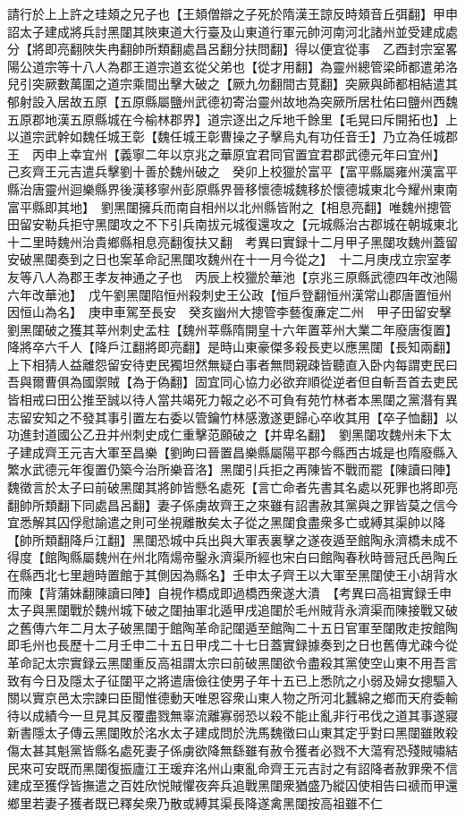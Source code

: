 請行於上上許之珪頍之兄子也【王頍僧辯之子死於隋漢王諒反時頍音丘弭翻】甲申詔太子建成將兵討黑闥其陜東道大行臺及山東道行軍元帥河南河北諸州並受建成處分【將即亮翻陜失冉翻帥所類翻處昌呂翻分扶問翻】得以便宜從事　乙酉封宗室畧陽公道宗等十八人為郡王道宗道玄從父弟也【從才用翻】為靈州總管梁師都遣弟洛兒引突厥數萬圍之道宗乘間出擊大破之【厥九勿翻間古莧翻】突厥與師都相結遣其郁射設入居故五原【五原縣屬鹽州武德初寄治靈州故地為突厥所居杜佑曰鹽州西魏五原郡地漢五原縣城在今榆林郡界】道宗逐出之斥地千餘里【毛晃曰斥開拓也】上以道宗武幹如魏任城王彰【魏任城王彰曹操之子擊烏丸有功任音壬】乃立為任城郡王　丙申上幸宜州【義寧二年以京兆之華原宜君同官置宜君郡武德元年曰宜州】　己亥齊王元吉遣兵擊劉十善於魏州破之　癸卯上校獵於富平【富平縣屬雍州漢富平縣治唐靈州迴樂縣界後漢移寧州彭原縣界晉移懷德城魏移於懷德城東北今耀州東南富平縣即其地】　劉黑闥擁兵而南自相州以北州縣皆附之【相息亮翻】唯魏州摠管田留安勒兵拒守黑闥攻之不下引兵南拔元城復還攻之【元城縣治古郡城在朝城東北十二里時魏州治貴鄉縣相息亮翻復扶又翻　考異曰實録十二月甲子黑闥攻魏州蓋留安破黑闥奏到之日也案革命記黑闥攻魏州在十一月今從之】　十二月庚戌立宗室孝友等八人為郡王孝友神通之子也　丙辰上校獵於華池【京兆三原縣武德四年改池陽六年改華池】　戊午劉黑闥陷恒州殺刺史王公政【恒戶登翻恒州漢常山郡唐置恒州因恒山為名】　庚申車駕至長安　癸亥幽州大摠管李藝復亷定二州　甲子田留安擊劉黑闥破之獲其莘州刺史孟柱【魏州莘縣隋開皇十六年置莘州大業二年廢唐復置】降將卒六千人【降戶江翻將即亮翻】是時山東豪傑多殺長吏以應黑闥【長知兩翻】上下相猜人益離怨留安待吏民獨坦然無疑白事者無問親疎皆聽直入卧内每謂吏民曰吾與爾曹俱為國禦賊【為于偽翻】固宜同心協力必欲弃順從逆者但自斬吾首去吏民皆相戒曰田公推至誠以待人當共竭死力報之必不可負有苑竹林者本黑闥之黨潛有異志留安知之不發其事引置左右委以管鑰竹林感激遂更歸心卒收其用【卒子恤翻】以功進封道國公乙丑并州刺史成仁重擊范願破之【并卑名翻】　劉黑闥攻魏州未下太子建成齊王元吉大軍至昌樂【劉昫曰晉置昌樂縣屬陽平郡今縣西古城是也隋廢縣入繁水武德元年復置仍築今治所樂音洛】黑闥引兵拒之再陳皆不戰而罷【陳讀曰陣】魏徵言於太子曰前破黑闥其將帥皆懸名處死【言亡命者先書其名處以死罪也將即亮翻帥所類翻下同處昌呂翻】妻子係虜故齊王之來雖有詔書赦其黨與之罪皆莫之信今宜悉解其囚俘慰諭遣之則可坐視離散矣太子從之黑闥食盡衆多亡或縛其渠帥以降【帥所類翻降戶江翻】黑闥恐城中兵出與大軍表裏擊之遂夜遁至館陶永濟橋未成不得度【館陶縣屬魏州在州北隋煬帝鑿永濟渠所經也宋白曰館陶春秋時晉冠氏邑陶丘在縣西北七里趙時置館于其側因為縣名】壬申太子齊王以大軍至黑闥使王小胡背水而陳【背蒲妹翻陳讀曰陣】自視作橋成即過橋西衆遂大潰　【考異曰高祖實録壬申太子與黑闥戰於魏州城下破之闥抽軍北遁甲戌追闥於毛州賊背永濟渠而陳接戰又破之舊傳六年二月太子破黑闥于館陶革命記闥遁至館陶二十五日官軍至闥敗走按館陶即毛州也長歷十二月壬申二十五日甲戌二十七日蓋實録據奏到之日也舊傳尤疎今從革命記太宗實録云黑闥重反高祖謂太宗曰前破黑闥欲令盡殺其黨使空山東不用吾言致有今日及隱太子征闥平之將遣唐儉往使男子年十五已上悉阬之小弱及婦女摠驅入關以實京邑太宗諫曰臣聞惟德動天唯恩容衆山東人物之所河北蠶綿之鄉而天府委輸待以成績今一旦見其反覆盡戮無辜流離寡弱恐以殺不能止亂非行弔伐之道其事遂寢新書隱太子傳云黑闥敗於洺水太子建成問於洗馬魏徵曰山東其定乎對曰黑闥雖敗殺傷太甚其魁黨皆縣名處死妻子係虜欲降無繇雖有赦令獲者必戮不大蕩宥恐殘賊嘯結民來可安既而黑闥復振廬江王瑗弃洺州山東亂命齊王元吉討之有詔降者赦罪衆不信建成至獲俘皆撫遣之百姓欣悦賊懼夜奔兵追戰黑闥衆猶盛乃縱囚使相告曰禠而甲還鄉里若妻子獲者既已釋矣衆乃散或縛其渠長降遂禽黑闥按高祖雖不仁